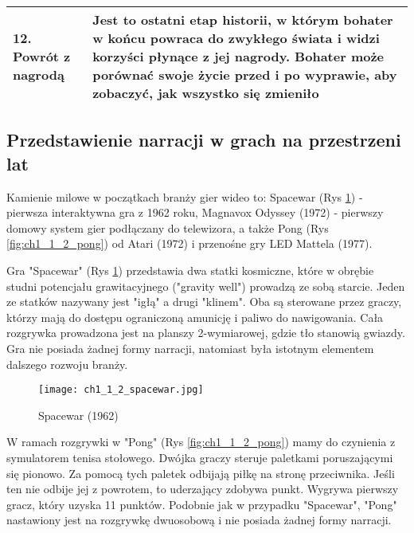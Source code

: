 \begin{table}[h!]
\begin{center}
\begin{tabular}{p{1.5in} p{4in}}
			12. Powrót z nagrodą                & Jest to ostatni etap historii, w którym bohater w końcu powraca do zwykłego świata i widzi korzyści płynące z jej nagrody. Bohater może porównać swoje życie przed i po wyprawie, aby zobaczyć, jak wszystko się zmieniło                                                                                                       \\
			\hline
		\end{tabular}
	\end{center}
\end{table}

\newpage

\subsection{Przedstawienie narracji w grach na przestrzeni lat}\label{subsection:ch1_1_2}

Kamienie milowe w początkach branży gier wideo to: Spacewar (Rys \ref{fig:ch1_1_2_spacewar}) - pierwsza interaktywna gra z
1962 roku, Magnavox Odyssey (1972) - pierwszy domowy system gier podłączany do telewizora, a
także Pong (Rys \ref{fig:ch1_1_2_pong}) od Atari (1972) i przenośne gry LED Mattela (1977)\cite{the_evolution_of_video_games}.

Gra "Spacewar" (Rys \ref{fig:ch1_1_2_spacewar}) przedstawia dwa statki kosmiczne, które w obrębie studni potencjału grawitacyjnego ("gravity well")
prowadzą ze sobą starcie. Jeden ze statków nazywany jest "igłą" a drugi "klinem". Oba są sterowane przez
graczy, którzy mają do dostępu ograniczoną amunicję i paliwo do nawigowania. Cała rozgrywka prowadzona jest
na planszy 2-wymiarowej, gdzie tło stanowią gwiazdy. Gra nie posiada żadnej formy narracji, natomiast była
istotnym elementem dalszego rozwoju branży.

\begin{figure}[h]
	\caption{Spacewar (1962)}
	\texttt{[image: ch1\_1\_2\_spacewar.jpg]}
	\centering
	\label{fig:ch1_1_2_spacewar}
\end{figure}

W ramach rozgrywki w "Pong" (Rys \ref{fig:ch1_1_2_pong}) mamy do czynienia z symulatorem tenisa stołowego. Dwójka graczy steruje paletkami
poruszającymi się pionowo. Za pomocą tych paletek odbijają piłkę na stronę przeciwnika. Jeśli ten nie odbije
jej z powrotem, to uderzający zdobywa punkt. Wygrywa pierwszy gracz, który uzyska 11 punktów. Podobnie jak
w przypadku "Spacewar", "Pong" nastawiony jest na rozgrywkę dwuosobową i nie posiada żadnej formy narracji.

